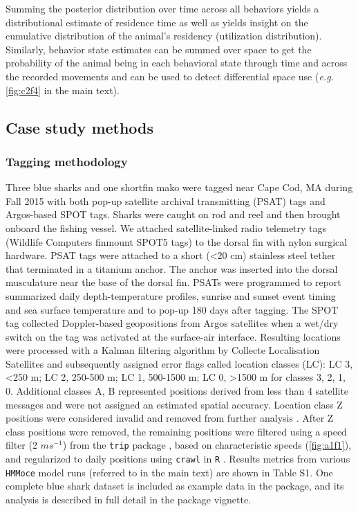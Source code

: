 Summing the posterior distribution over time across all behaviors yields
a distributional estimate of residence time \citep{Pedersen2011a} as
well as yields insight on the cumulative distribution of the animal's
residency (utilization distribution). Similarly, behavior state
estimates can be summed over space to get the probability of the animal
being in each behavioral state through time and across the recorded
movements and can be used to detect differential space use (\emph{e.g.} \cref{fig:c2f4}
in the main text).

\subsection{Case study methods}%

\subsubsection{Tagging methodology}%

Three blue sharks and one shortfin mako were tagged near Cape Cod, MA
during Fall 2015 with both pop-up satellite archival transmitting (PSAT)
tags and Argos-based SPOT tags. Sharks were caught on rod and reel and
then brought onboard the fishing vessel. We attached satellite-linked
radio telemetry tags (Wildlife Computers finmount SPOT5 tags) to the
dorsal fin with nylon surgical hardware. PSAT tags were attached to a
short (\textless{}20 cm) stainless steel tether that terminated in a
titanium anchor. The anchor was inserted into the dorsal musculature
near the base of the dorsal fin. PSATs were programmed to report
summarized daily depth-temperature profiles, sunrise and sunset event
timing and sea surface temperature and to pop-up 180 days after tagging.
The SPOT tag collected Doppler-based geopositions from Argos satellites
when a wet/dry switch on the tag was activated at the surface-air
interface. Resulting locations were processed with a Kalman filtering
algorithm by Collecte Localisation Satellites \citep{Lopez2014} and
subsequently assigned error flags called location classes (LC): LC 3,
\textless{}250 m; LC 2, 250-500 m; LC 1, 500-1500 m; LC 0,
\textgreater{}1500 m for classes 3, 2, 1, 0. Additional classes A, B
represented positions derived from less than 4 satellite messages and
were not assigned an estimated spatial accuracy. Location class Z
positions were considered invalid and removed from further analysis
\citep{CLS2008}. After Z class positions were removed, the remaining
positions were filtered using a speed filter (2 $m s^{-1}$) from the
\texttt{trip} package \citep{Sumner2015}, based on characteristic speeds
(\cref{fig:a1f1}), and regularized to daily positions using \texttt{crawl}
\citep{Johnson2008a} in \texttt{R} \citep{RDevelopmentCoreTeam2015}.
Results metrics from various \texttt{HMMoce} model runs (referred to in
the main text) are shown in Table S1. One complete blue shark dataset is
included as example data in the package, and its analysis is described
in full detail in the package vignette.

